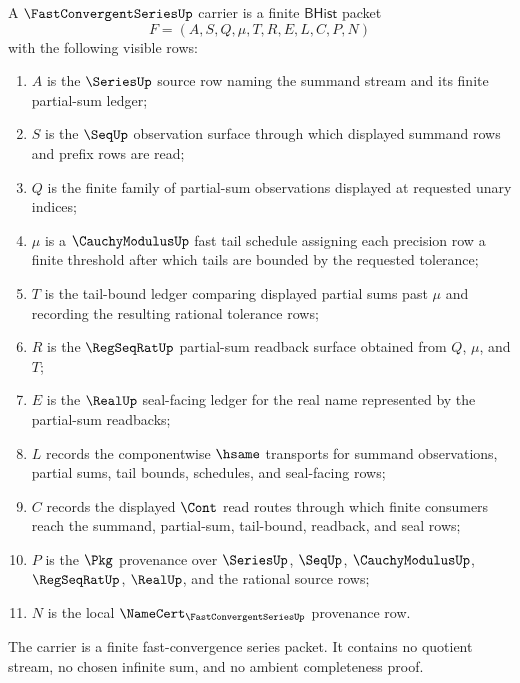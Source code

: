 \begin{definition}
\label{def:fastconvergentseries-bhist-carrier}
A $\FastConvergentSeriesUp$ carrier is a finite $\mathsf{BHist}$ packet
$$
F=(A,S,Q,\mu,T,R,E,L,C,P,N)
$$
with the following visible rows:
\begin{enumerate}
\item $A$ is the $\SeriesUp$ source row naming the summand stream and its finite partial-sum ledger;
\item $S$ is the $\SeqUp$ observation surface through which displayed summand rows and prefix rows are read;
\item $Q$ is the finite family of partial-sum observations displayed at requested unary indices;
\item $\mu$ is a $\CauchyModulusUp$ fast tail schedule assigning each precision row a finite threshold after which tails are bounded by the requested tolerance;
\item $T$ is the tail-bound ledger comparing displayed partial sums past $\mu$ and recording the resulting rational tolerance rows;
\item $R$ is the $\RegSeqRatUp$ partial-sum readback surface obtained from $Q$, $\mu$, and $T$;
\item $E$ is the $\RealUp$ seal-facing ledger for the real name represented by the partial-sum readbacks;
\item $L$ records the componentwise $\hsame$ transports for summand observations, partial sums, tail bounds, schedules, and seal-facing rows;
\item $C$ records the displayed $\Cont$ read routes through which finite consumers reach the summand, partial-sum, tail-bound, readback, and seal rows;
\item $P$ is the $\Pkg$ provenance over $\SeriesUp$, $\SeqUp$, $\CauchyModulusUp$, $\RegSeqRatUp$, $\RealUp$, and the rational source rows;
\item $N$ is the local $\NameCert_{\FastConvergentSeriesUp}$ provenance row.
\end{enumerate}
The carrier is a finite fast-convergence series packet. It contains no quotient stream, no chosen infinite sum, and no ambient completeness proof.
\end{definition}

